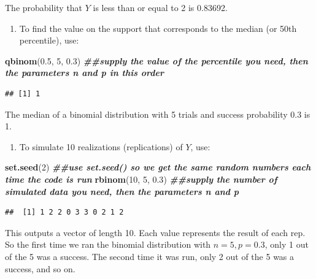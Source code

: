 \documentclass[
]{book}
\newenvironment{Shaded}{\begin{snugshade}}{\end{snugshade}}
\newcommand{\DecValTok}[1]{\textcolor[rgb]{0.00,0.00,0.81}{#1}}
\newcommand{\DocumentationTok}[1]{\textcolor[rgb]{0.56,0.35,0.01}{\textbf{\textit{#1}}}}
\newcommand{\FloatTok}[1]{\textcolor[rgb]{0.00,0.00,0.81}{#1}}
\newcommand{\FunctionTok}[1]{\textcolor[rgb]{0.13,0.29,0.53}{\textbf{#1}}}
\newcommand{\NormalTok}[1]{#1}
\providecommand{\tightlist}{%
  \setlength{\itemsep}{0pt}\setlength{\parskip}{0pt}}
\begin{document}
The probability that \(Y\) is less than or equal to 2 is 0.83692.

\begin{enumerate}
\def\labelenumi{\arabic{enumi}.}
\setcounter{enumi}{2}
\tightlist
\item
  To find the value on the support that corresponds to the median (or 50th percentile), use:
\end{enumerate}

\begin{Shaded}
\begin{Highlighting}[]
\FunctionTok{qbinom}\NormalTok{(}\FloatTok{0.5}\NormalTok{, }\DecValTok{5}\NormalTok{, }\FloatTok{0.3}\NormalTok{) }\DocumentationTok{\#\#supply the value of the percentile you need, then the parameters n and p in this order}
\end{Highlighting}
\end{Shaded}

\begin{verbatim}
## [1] 1
\end{verbatim}

The median of a binomial distribution with 5 trials and success probability 0.3 is 1.

\begin{enumerate}
\def\labelenumi{\arabic{enumi}.}
\setcounter{enumi}{3}
\tightlist
\item
  To simulate 10 realizations (replications) of \(Y\), use:
\end{enumerate}

\begin{Shaded}
\begin{Highlighting}[]
\FunctionTok{set.seed}\NormalTok{(}\DecValTok{2}\NormalTok{) }\DocumentationTok{\#\#use set.seed() so we get the same random numbers each time the code is run}
\FunctionTok{rbinom}\NormalTok{(}\DecValTok{10}\NormalTok{, }\DecValTok{5}\NormalTok{, }\FloatTok{0.3}\NormalTok{) }\DocumentationTok{\#\#supply the number of simulated data you need, then the parameters n and p}
\end{Highlighting}
\end{Shaded}

\begin{verbatim}
##  [1] 1 2 2 0 3 3 0 2 1 2
\end{verbatim}

This outputs a vector of length 10. Each value represents the result of each rep. So the first time we ran the binomial distribution with \(n=5, p=0.3\), only 1 out of the 5 was a success. The second time it was run, only 2 out of the 5 was a success, and so on.
\end{document}
